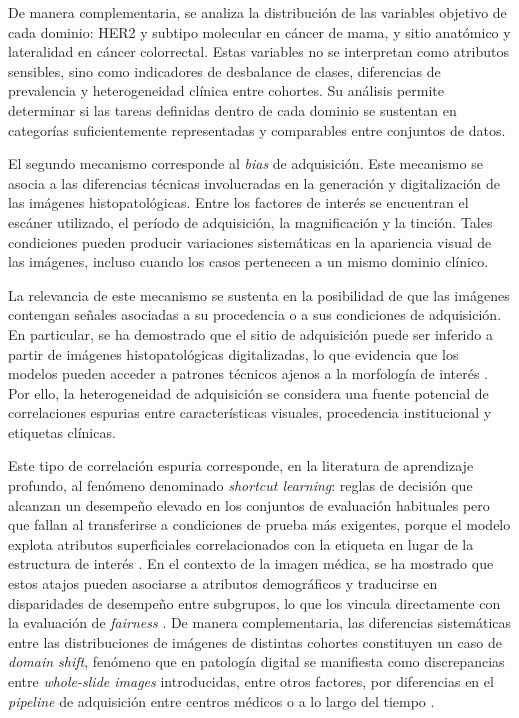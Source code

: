 De manera complementaria, se analiza la distribución de las variables objetivo de cada dominio: HER2 y subtipo molecular en cáncer de mama, y sitio anatómico y lateralidad en cáncer colorrectal. Estas variables no se interpretan como atributos sensibles, sino como indicadores de desbalance de clases, diferencias de prevalencia y heterogeneidad clínica entre cohortes. Su análisis permite determinar si las tareas definidas dentro de cada dominio se sustentan en categorías suficientemente representadas y comparables entre conjuntos de datos.

El segundo mecanismo corresponde al \textit{bias} de adquisición. Este mecanismo se asocia a las diferencias técnicas involucradas en la generación y digitalización de las imágenes histopatológicas. Entre los factores de interés se encuentran el escáner utilizado, el período de adquisición, la magnificación y la tinción. Tales condiciones pueden producir variaciones sistemáticas en la apariencia visual de las imágenes, incluso cuando los casos pertenecen a un mismo dominio clínico.

La relevancia de este mecanismo se sustenta en la posibilidad de que las imágenes contengan señales asociadas a su procedencia o a sus condiciones de adquisición. En particular, se ha demostrado que el sitio de adquisición puede ser inferido a partir de imágenes histopatológicas digitalizadas, lo que evidencia que los modelos pueden acceder a patrones técnicos ajenos a la morfología de interés \parencite{alsaafin2023biased}. Por ello, la heterogeneidad de adquisición se considera una fuente potencial de correlaciones espurias entre características visuales, procedencia institucional y etiquetas clínicas.

Este tipo de correlación espuria corresponde, en la literatura de aprendizaje profundo, al fenómeno denominado \textit{shortcut learning}: reglas de decisión que alcanzan un desempeño elevado en los conjuntos de evaluación habituales pero que fallan al transferirse a condiciones de prueba más exigentes, porque el modelo explota atributos superficiales correlacionados con la etiqueta en lugar de la estructura de interés \parencite{geirhos2020shortcut}. En el contexto de la imagen médica, se ha mostrado que estos atajos pueden asociarse a atributos demográficos y traducirse en disparidades de desempeño entre subgrupos, lo que los vincula directamente con la evaluación de \textit{fairness} \parencite{brown2023shortcut}. De manera complementaria, las diferencias sistemáticas entre las distribuciones de imágenes de distintas cohortes constituyen un caso de \textit{domain shift}, fenómeno que en patología digital se manifiesta como discrepancias entre \textit{whole-slide images} introducidas, entre otros factores, por diferencias en el \textit{pipeline} de adquisición entre centros médicos o a lo largo del tiempo \parencite{stacke2021domainshift}.


